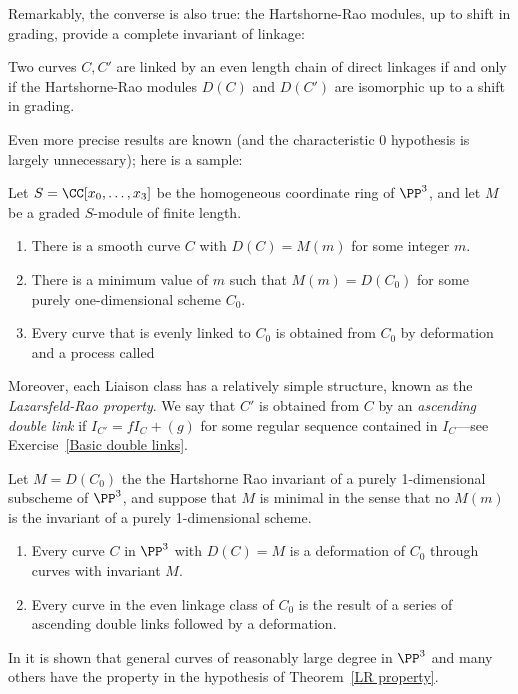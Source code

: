 Remarkably, the converse is also true: the Hartshorne-Rao modules, up to shift in grading, provide a complete invariant of
linkage: 
\begin{fact}
\begin{theorem}\cite{MR520926}
Two curves $C,C'$ are linked by an even length chain of direct linkages if and only if 
the Hartshorne-Rao modules $D(C)$ and $D(C')$ are isomorphic up to a shift in grading.
\end{theorem}

Even more precise results are known (and the characteristic 0 hypothesis is largely unnecessary); here is a sample:

\begin{theorem}
Let $S = \CC[x_0, \dots, x_3]$ be the homogeneous coordinate ring of $\PP^3$, and let $M$ be a graded $S$-module of finite length.
\begin{enumerate}
\item There is a smooth curve $C$ with $D(C) = M(m)$ for some integer $m$.
\item There is a minimum value of $m$ such that $M(m) = D(C_0)$ for some purely one-dimensional scheme $C_0$.
\item Every curve that is evenly linked to $C_0$ is obtained from $C_0$ by deformation and a process called
\end{enumerate}
\end{theorem}

Moreover, each Liaison class has a relatively simple structure, known as the \emph{Lazarsfeld-Rao property}.
We say that $C'$ is obtained from $C$ by an \emph{ascending double link} if $I_{C'} = fI_C+(g)$ for some regular sequence
contained in $I_C$---see Exercise~\ref{Basic double links}. 

\begin{theorem}\cite{MR1087803}\label{LR property}
Let $M = D(C_0)$ the the Hartshorne Rao invariant of a purely 1-dimensional subscheme of $\PP^3$, and suppose that
$M$ is minimal in the sense that no $M(m)$ is the invariant of a purely 1-dimensional scheme. 
\begin{enumerate}
 \item Every curve $C$ in $\PP^3$ with $D(C) = M$ is a deformation of $C_0$ through curves with invariant $M$.
 \item Every curve in the even linkage class of $C_0$ is the result of a series of ascending double links followed by a deformation.
\end{enumerate}
\end{theorem}

In \cite{MR714753} it is shown that general curves of reasonably large degree in $\PP^3$ and many others have the property in the hypothesis
of  Theorem~\ref{LR property}.
\end{fact}

